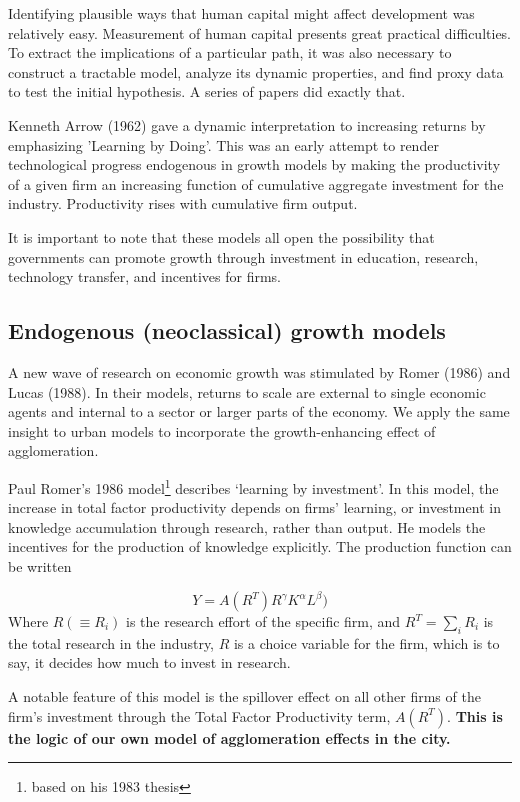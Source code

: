 Identifying  plausible ways that human capital might affect development was relatively easy. Measurement of human capital presents great practical difficulties. To extract the implications of a particular path, it was also necessary to construct a tractable model, analyze its dynamic properties, and find proxy data to test the initial hypothesis.   A series of papers did exactly that.

Kenneth Arrow (1962) gave a dynamic interpretation to increasing returns by emphasizing 'Learning by Doing'. This was an early attempt to render technological progress endogenous in growth models by making the productivity of a given firm an increasing function of cumulative aggregate investment for the industry. Productivity rises with cumulative firm output.


 It is important to note that these models all open the possibility that governments can  promote growth through investment in education, research, technology transfer, and incentives for firms.

\subsection{Endogenous (neoclassical) growth models}
A new wave of research on economic growth was stimulated by Romer (1986) and Lucas (1988). In their models, returns to scale are external to single economic agents and internal to a sector or larger parts of the economy. We apply the same insight to urban models to incorporate the growth-enhancing effect of agglomeration. 


Paul Romer's 1986  model\footnote{ based on his 1983 thesis} describes `learning by investment'. In this model, the increase in total factor productivity depends on firms’ learning, or investment in knowledge accumulation through research, rather than output. He models the incentives for the production of knowledge explicitly. The production function  can be written

\[Y = A(R^T)R^\gamma  K^\alpha L^\beta) \]
Where $R(\equiv R_i)$ is the research effort of the specific firm, and $R^T=\sum_iR_i$ is the total research in the industry,  $R$ is a choice variable for the firm, which is to say, it decides how much to invest in research. 

A notable feature of this model is the spillover effect on all other firms of the firm's investment through the Total Factor Productivity term,  $A(R^T)$. \textbf{This is the logic of our own model of agglomeration effects in the city.}



